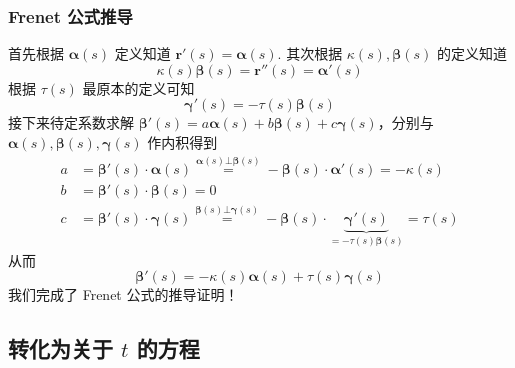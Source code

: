 \subsubsection{Frenet 公式推导}

首先根据 $\boldsymbol{\alpha}(s)$ 定义知道 $\boldsymbol{r}'(s)=\boldsymbol{\alpha}(s)$. 其次根据 $\kappa(s),\boldsymbol{\beta}(s)$ 的定义知道
\[
\kappa(s)\boldsymbol{\beta}(s)=\boldsymbol{r}''(s)=\boldsymbol{\alpha}'(s)
\]
根据 $\tau(s)$ 最原本的定义可知
\[
\boldsymbol{\gamma}'(s)=-\tau(s)\boldsymbol{\beta}(s)
\]
接下来待定系数求解 $\boldsymbol{\beta}'(s)=a\boldsymbol{\alpha}(s)+b\boldsymbol{\beta}(s)+c\boldsymbol{\gamma}(s)$，分别与 $\boldsymbol{\alpha}(s),\boldsymbol{\beta}(s),\boldsymbol{\gamma}(s)$ 作内积得到
\[
\begin{aligned}
a & =\boldsymbol{\beta}'(s)\cdot\boldsymbol{\alpha}(s)\overset{ \boldsymbol{\alpha}(s)\bot\boldsymbol{\beta}(s) }{ = }-\boldsymbol{\beta}(s)\cdot\boldsymbol{\alpha}'(s)=-\kappa(s) \\
b & =\boldsymbol{\beta}'(s)\cdot\boldsymbol{\beta}(s)=0 \\
c & =\boldsymbol{\beta}'(s)\cdot\boldsymbol{\gamma}(s)\overset{ \boldsymbol{\beta}(s)\bot\boldsymbol{\gamma}(s) }{ = }-\boldsymbol{\beta}(s)\cdot\underbrace{ \boldsymbol{\gamma}'(s) }_{ =-\tau(s)\boldsymbol{\beta}(s) }=\tau(s)
\end{aligned}
\]
从而
\[
\boldsymbol{\beta}'(s)=-\kappa(s)\boldsymbol{\alpha}(s)+\tau(s)\boldsymbol{\gamma}(s)
\]
我们完成了 Frenet 公式的推导证明！

\subsection{转化为关于 \texorpdfstring{$t$}{t} 的方程}

